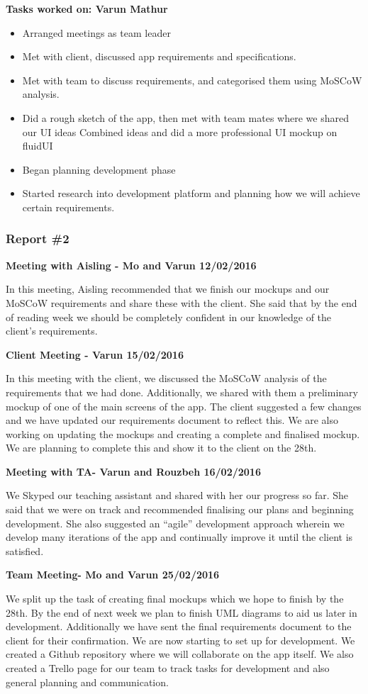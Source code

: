 \documentclass[12pt]{article}
\begin{document}
\bigskip

\textbf{Tasks worked on: Varun Mathur}
\begin{itemize}
\item Arranged meetings as team leader
\item Met with client, discussed app requirements and specifications.
\item Met with team to discuss requirements, and categorised them using MoSCoW analysis.
\item Did a rough sketch of the app, then met with team mates where we shared our UI ideas
Combined ideas and did a more professional UI mockup on fluidUI
\item Began planning development phase
\item Started research into development platform and planning how we will achieve certain requirements.
\end{itemize}

\subsubsection{Report \#2}
	\textbf{Meeting with Aisling - Mo and Varun 12/02/2016}
\par
	In this meeting, Aisling recommended that we finish our mockups and our MoSCoW requirements and share these with the client. She said that by the end of reading week we should be completely confident in our knowledge of the client’s requirements.
\par
\bigskip
	\textbf{Client Meeting - Varun 15/02/2016}
\par
	In this meeting with the client, we discussed the MoSCoW analysis of the requirements that we had done. Additionally, we shared with them a preliminary mockup of one of the main screens of the app. The client suggested a few changes and we have updated our requirements document to reflect this. We are also working on updating the mockups and creating a complete and finalised mockup. We are planning to complete this and show it to the client on the 28th. 
\par
\bigskip
	\textbf{Meeting with TA- Varun and Rouzbeh 16/02/2016}
\par
We Skyped our teaching assistant and shared with her our progress so far. She said that we were on track and recommended finalising our plans and beginning development. She also suggested an “agile” development approach wherein we develop many iterations of the app and continually improve it until the client is satisfied. 
\par
\bigskip
\textbf{Team Meeting- Mo and Varun 25/02/2016}
\par
	We split up the task of creating final mockups which we hope to finish by the 28th. By the end of next week we plan to finish UML diagrams to aid us later in development. Additionally we have sent the final requirements document to the client for their confirmation. We are now starting to set up for development. We created a Github repository where we will collaborate on the app itself. We also created a Trello page for our team to track tasks for development and also general planning and communication. 
\par
\bigskip
\end{document}
